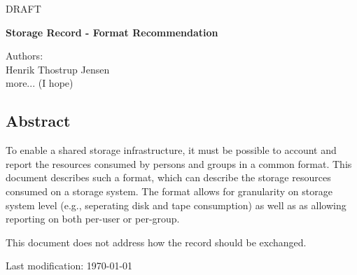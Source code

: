 
\huge{DRAFT}

\vspace{1cm}

{\Large \bf Storage Record - Format Recommendation}

\vspace{1.5cm}

\large{Authors:\\
Henrik Thostrup Jensen\\
more... (I hope)
}

\vspace{0.5cm}

\subsection*{Abstract}

To enable a shared storage infrastructure, it must be possible to account and
report the resources consumed by persons and groups in a common format. This
document describes such a format, which can describe the storage resources
consumed on a storage system. The format allows for granularity on storage
system level (e.g., seperating disk and tape consumption) as well as as
allowing reporting on both per-user or per-group.

\vspace{.5cm}

\noindent
This document does not address how the record should be exchanged.


\vspace{2cm}

Last modification: \today


